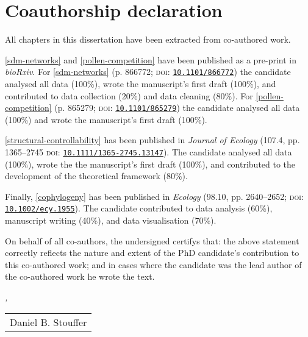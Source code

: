 
{}
\chapter*{Coauthorship declaration}
\thispagestyle{empty}

\begin{refsection}

All chapters in this dissertation have been extracted from co-authored work.

\autoref{sdm-networks} and \autoref{pollen-competition} have been published as a pre-print in \emph{bioRxiv}.
For \autoref{sdm-networks} (p. 866772; \textsc{doi}: \href{https://doi.org/10.1101/866772}{\texttt{10.1101/866772}}) the candidate analysed all data (100\%), wrote the manuscript's first draft (100\%), and contributed to data collection (20\%) and data cleaning (80\%).
For \autoref{pollen-competition} (p. 865279; \textsc{doi}: \href{https://doi.org/10.1101/865279}{\texttt{10.1101/865279}}) the candidate analysed all data (100\%) and wrote the manuscript's first draft (100\%).

\autoref{structural-controllability} has been published in \emph{Journal of Ecology} (107.4, pp. 1365--2745 \textsc{doi}: \href{https://doi.org/10.1111/1365-2745.13147}{\texttt{10.1111/1365-2745.13147}}). The candidate analysed all data (100\%), wrote the the manuscript's first draft (100\%), and contributed to the development of the theoretical framework (80\%).

Finally, \autoref{cophylogeny} has been published in \emph{Ecology} (98.10, pp. 2640--2652; \textsc{doi}: \href{https://doi.org/10.1002/ecy.1955}{\texttt{10.1002/ecy.1955}}). The candidate contributed to data analysis (60\%), manuscript writing (40\%), and data visualisation (70\%).

\end{refsection}

On behalf of all co-authors, the undersigned certifys that: the above statement correctly reflects the nature and extent of the PhD candidate's contribution to this co-authored work; and in cases where the candidate was the lead author of the co-authored work he wrote the text.

\bigskip

\noindent\textit{\myLocation, \myTime}

\smallskip

\begin{flushright}
    \begin{tabular}{m{5cm}}
        \\ \hline
        \centering Daniel B. Stouffer \\
    \end{tabular}
\end{flushright}
